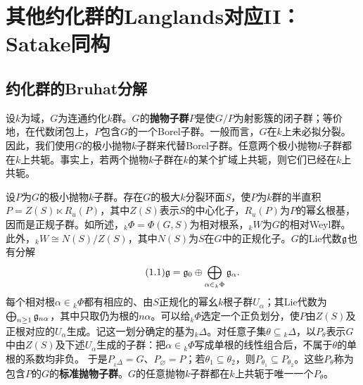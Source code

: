 \chapter{其他约化群的Langlands对应II：Satake同构}\label{L19}
\section{约化群的Bruhat分解}\label{L19S1}
设$k$为域，$G$为连通约化$k$群。$G$的\textbf{抛物子群}$P$是使$G/P$为射影簇的闭子群；等价地，在代数闭包上，$P$包含$G$的一个Borel子群。一般而言，$G$在$k$上未必拟分裂。因此，我们使用$G$的极小抛物$k$子群来代替Borel子群。任意两个极小抛物$k$子群都在$k$上共轭。事实上，若两个抛物$k$子群在$k$的某个扩域上共轭，则它们已经在$k$上共轭。

设$P$为$G$的极小抛物$k$子群。存在$G$的极大$k$分裂环面$S$，使$P$为$k$群的半直积$P=Z(S)\ltimes R_u(P)$，其中$Z(S)$表示$S$的中心化子，$R_u(P)$为$P$的幂幺根基，因而是正规子群。如所述，${}_k\Phi=\Phi(G,S)$为相对根系，${}_kW$为$G$的相对Weyl群。此外，${}_kW\cong N(S)/Z(S)$，其中$N(S)$为$S$在$G$中的正规化子。$G$的Lie代数$\mathfrak{g}$也有分解
\begin{equation}\tag{1.1}\label{L19eq11}\mathfrak{g}=\mathfrak{g}_0\oplus\bigoplus_{\alpha\in{}_k\Phi}\mathfrak{g}_\alpha.\end{equation}
每个相对根$\alpha\in{}_k\Phi$都有相应的、由$S$正规化的幂幺$k$根子群$U_\alpha$；其Lie代数为$\bigoplus_{n\ge1}\mathfrak{g}_{n\alpha}$，其中只取仍为根的$n\alpha$。可以给${}_k\Phi$选定一个正负划分，使$P$由$Z(S)$及正根对应的$U_\alpha$生成。记这一划分确定的基为${}_k\Delta$。对任意子集$\theta\subseteq{}_k\Delta$，以$P_\theta$表示$G$中由$Z(S)$及下述$U_\alpha$生成的子群：把$\alpha\in{}_k\Phi$写成单根的线性组合后，不属于$\theta$的单根的系数均非负。
于是$P_{{}_k\Delta}=G$、$P_\varnothing=P$；若$\theta_1\subseteq\theta_2$，则$P_{\theta_1}\subseteq P_{\theta_2}$。这些$P_\theta$称为包含$P$的$G$的\textbf{标准抛物子群}。$G$的任意抛物$k$子群都在$k$上共轭于唯一一个$P_\theta$。

